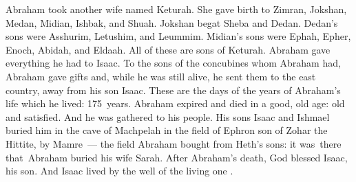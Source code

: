 
\begin{inparaenum}
   Abraham took another wife named Keturah.%
   She gave birth to Zimran, Jokshan, Medan, Midian, Ishbak, and Shuah.%
   Jokshan begat Sheba and Dedan. Dedan's sons were Asshurim, Letushim, and Leummim.%
   Midian's sons were Ephah, Epher, Enoch, Abidah, and Eldaah. All of these are sons of Keturah.%
   Abraham gave everything he had to Isaac.%
   To the sons of the concubines whom Abraham had, Abraham gave gifts and, while he was still alive, he sent them to the east country, away from his son Isaac.%
   These are the days of the years of Abraham's life which he lived: 175~years.%
   Abraham expired and died in a good, old age: old and satisfied. And he was gathered to his people.%
   His sons Isaac and Ishmael buried him in the cave of Machpelah in the field of Ephron son of Zohar the Hittite, by Mamre~---%
   the field Abraham bought from Heth's sons: it was\understood{}\ there that\understood{}\ Abraham buried his wife Sarah.%
   After Abraham's death, God blessed Isaac, his son. And Isaac lived by the well of the living one .%


\end{inparaenum}

